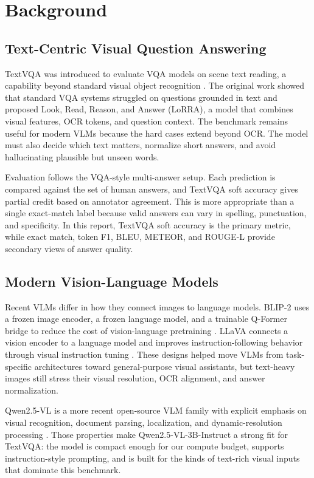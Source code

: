 \documentclass[11pt]{article}
\begin{document}
\section{Background}

\subsection{Text-Centric Visual Question Answering}

TextVQA was introduced to evaluate VQA models on scene text reading, a capability beyond standard visual object recognition \cite{singh2019textvqa}. The original work showed that standard VQA systems struggled on questions grounded in text and proposed Look, Read, Reason, and Answer (LoRRA), a model that combines visual features, OCR tokens, and question context. The benchmark remains useful for modern VLMs because the hard cases extend beyond OCR. The model must also decide which text matters, normalize short answers, and avoid hallucinating plausible but unseen words.

Evaluation follows the VQA-style multi-answer setup. Each prediction is compared against the set of human answers, and TextVQA soft accuracy gives partial credit based on annotator agreement. This is more appropriate than a single exact-match label because valid answers can vary in spelling, punctuation, and specificity. In this report, TextVQA soft accuracy is the primary metric, while exact match, token F1, BLEU, METEOR, and ROUGE-L provide secondary views of answer quality.

\subsection{Modern Vision-Language Models}

Recent VLMs differ in how they connect images to language models. BLIP-2 uses a frozen image encoder, a frozen language model, and a trainable Q-Former bridge to reduce the cost of vision-language pretraining \cite{li2023blip2}. LLaVA connects a vision encoder to a language model and improves instruction-following behavior through visual instruction tuning \cite{liu2023llava}. These designs helped move VLMs from task-specific architectures toward general-purpose visual assistants, but text-heavy images still stress their visual resolution, OCR alignment, and answer normalization.

Qwen2.5-VL is a more recent open-source VLM family with explicit emphasis on visual recognition, document parsing, localization, and dynamic-resolution processing \cite{bai2025qwen25vl}. Those properties make Qwen2.5-VL-3B-Instruct a strong fit for TextVQA: the model is compact enough for our compute budget, supports instruction-style prompting, and is built for the kinds of text-rich visual inputs that dominate this benchmark.
\end{document}
